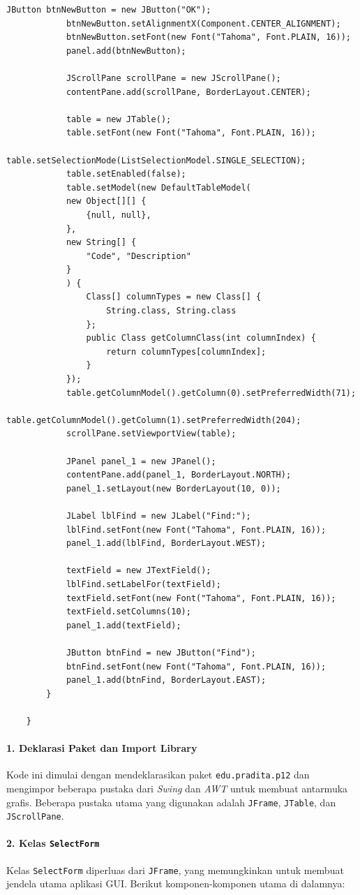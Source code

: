 \begin{lstlisting}[style=JavaStyle]
			JButton btnNewButton = new JButton("OK");
			btnNewButton.setAlignmentX(Component.CENTER_ALIGNMENT);
			btnNewButton.setFont(new Font("Tahoma", Font.PLAIN, 16));
			panel.add(btnNewButton);
			
			JScrollPane scrollPane = new JScrollPane();
			contentPane.add(scrollPane, BorderLayout.CENTER);
			
			table = new JTable();
			table.setFont(new Font("Tahoma", Font.PLAIN, 16));
			table.setSelectionMode(ListSelectionModel.SINGLE_SELECTION);
			table.setEnabled(false);
			table.setModel(new DefaultTableModel(
			new Object[][] {
				{null, null},
			},
			new String[] {
				"Code", "Description"
			}
			) {
				Class[] columnTypes = new Class[] {
					String.class, String.class
				};
				public Class getColumnClass(int columnIndex) {
					return columnTypes[columnIndex];
				}
			});
			table.getColumnModel().getColumn(0).setPreferredWidth(71);
			table.getColumnModel().getColumn(1).setPreferredWidth(204);
			scrollPane.setViewportView(table);
			
			JPanel panel_1 = new JPanel();
			contentPane.add(panel_1, BorderLayout.NORTH);
			panel_1.setLayout(new BorderLayout(10, 0));
			
			JLabel lblFind = new JLabel("Find:");
			lblFind.setFont(new Font("Tahoma", Font.PLAIN, 16));
			panel_1.add(lblFind, BorderLayout.WEST);
			
			textField = new JTextField();
			lblFind.setLabelFor(textField);
			textField.setFont(new Font("Tahoma", Font.PLAIN, 16));
			textField.setColumns(10);
			panel_1.add(textField);
			
			JButton btnFind = new JButton("Find");
			btnFind.setFont(new Font("Tahoma", Font.PLAIN, 16));
			panel_1.add(btnFind, BorderLayout.EAST);
		}
		
	}
\end{lstlisting}


\paragraph{1. Deklarasi Paket dan Import Library}
Kode ini dimulai dengan mendeklarasikan paket \texttt{edu.pradita.p12} dan mengimpor beberapa pustaka dari \textit{Swing} dan \textit{AWT} untuk membuat antarmuka grafis. Beberapa pustaka utama yang digunakan adalah \texttt{JFrame}, \texttt{JTable}, dan \texttt{JScrollPane}.

\paragraph{2. Kelas \texttt{SelectForm}}
Kelas \texttt{SelectForm} diperluas dari \texttt{JFrame}, yang memungkinkan untuk membuat jendela utama aplikasi GUI. Berikut komponen-komponen utama di dalamnya:

